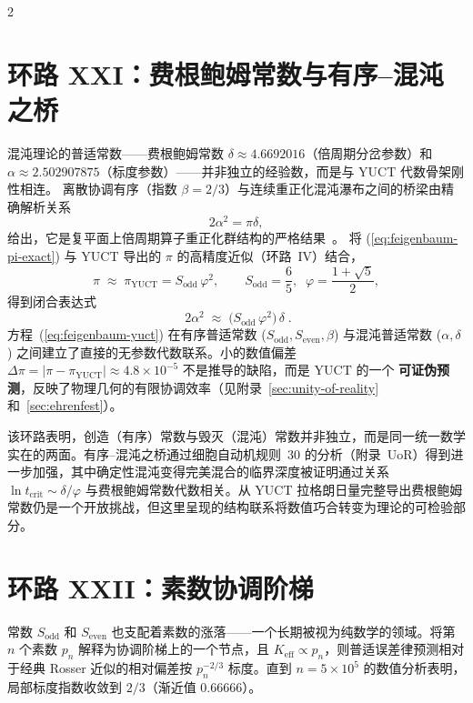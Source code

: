\documentclass[12pt,a4paper]{article}
\begin{document}
\begin{multicols}{2}
		\section{环路 XXI：费根鲍姆常数与有序–混沌之桥}
		
		混沌理论的普适常数——费根鲍姆常数
		\(\delta \approx 4.6692016\)（倍周期分岔参数）和
		\(\alpha \approx 2.502907875\)（标度参数）——并非独立的经验数，而是与 YUCT 代数骨架刚性相连。
		离散协调有序（指数 \(\beta=2/3\)）与连续重正化混沌瀑布之间的桥梁由精确解析关系
		\begin{equation}
			2\alpha^2 = \pi \delta,
			\label{eq:feigenbaum-pi-exact}
		\end{equation}
		给出，它是复平面上倍周期算子重正化群结构的严格结果~\cite{Feigenbaum1978}。
		将 (\ref{eq:feigenbaum-pi-exact}) 与 YUCT 导出的 \(\pi\) 的高精度近似（环路~IV）结合，
		\begin{equation}
			\pi \;\approx\; \pi_{\mathrm{YUCT}} = S_{\mathrm{odd}}\,\varphi^2,
			\qquad
			S_{\mathrm{odd}} = \frac{6}{5},\;\; \varphi = \frac{1+\sqrt{5}}{2},
		\end{equation}
		得到闭合表达式
		\begin{equation}
			\boxed{\;
				2\alpha^2 \;\approx\; \bigl(S_{\mathrm{odd}}\,\varphi^2\bigr)\,\delta
				\;}.
			\label{eq:feigenbaum-yuct}
		\end{equation}
		方程~(\ref{eq:feigenbaum-yuct}) 在有序普适常数 (\(S_{\mathrm{odd}}, S_{\mathrm{even}}, \beta\)) 与混沌普适常数 (\(\alpha, \delta\)) 之间建立了直接的无参数代数联系。小的数值偏差
		\(\Delta\pi = |\pi - \pi_{\mathrm{YUCT}}| \approx 4.8\times10^{-5}\)
		不是推导的缺陷，而是 YUCT 的一个 \textbf{可证伪预测}，反映了物理几何的有限协调效率（见附录~\ref{sec:unity-of-reality} 和~\ref{sec:ehrenfest}）。
		
		该环路表明，创造（有序）常数与毁灭（混沌）常数并非独立，而是同一统一数学实在的两面。有序–混沌之桥通过细胞自动机规则~30 的分析（附录~UoR）得到进一步加强，其中确定性混沌变得完美混合的临界深度被证明通过关系 \(\ln t_{\mathrm{crit}} \sim \delta/\varphi\) 与费根鲍姆常数代数相关。从 YUCT 拉格朗日量完整导出费根鲍姆常数仍是一个开放挑战，但这里呈现的结构联系将数值巧合转变为理论的可检验部分。
		
		\section{环路 XXII：素数协调阶梯}
		
		常数 \(S_{\mathrm{odd}}\) 和 \(S_{\mathrm{even}}\) 也支配着素数的涨落——一个长期被视为纯数学的领域。将第 \(n\) 个素数 \(p_n\) 解释为协调阶梯上的一个节点，且 \(K_{\mathrm{eff}} \propto p_n\)，则普适误差律预测相对于经典 Rosser 近似的相对偏差按 \(p_n^{-2/3}\) 标度。直到 \(n = 5\times10^5\) 的数值分析表明，局部标度指数收敛到 \(2/3\)（渐近值 \(0.66666\)）。
		

\end{multicols}
\end{document}

